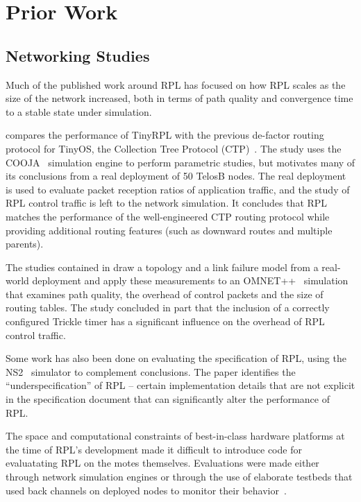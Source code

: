 \section{Prior Work}

\subsection{Networking Studies}
Much of the published work around RPL has focused on how RPL scales as the size
of the network increased, both in terms of path quality and convergence time to
a stable state under simulation. 

\cite{ko2011evaluating} compares the performance of TinyRPL with the previous
de-factor routing protocol for TinyOS, the Collection Tree Protocol
(CTP)~\cite{ctp}. The study uses the COOJA~\cite{cooja} simulation engine to
perform parametric studies, but motivates many of its conclusions from a real
deployment of 50 TelosB nodes. The real deployment is used to evaluate packet
reception ratios of application traffic, and the study of RPL control traffic
is left to the network simulation. It concludes that RPL matches the
performance of the well-engineered CTP routing protocol while providing
additional routing features (such as downward routes and multiple parents).

The studies contained in \cite{tripathi2010performance} draw a topology and a
link failure model from a real-world deployment and apply these measurements to
an OMNET++~\cite{omnet++} simulation that examines path quality, the overhead
of control packets and the size of routing tables. The study concluded in part
that the inclusion of a correctly configured Trickle timer has a significant influence
on the overhead of RPL control traffic.

Some work \cite{clausen2011critical} has also been done on evaluating the
specification of RPL, using the NS2~\cite{ns2} simulator to complement
conclusions. The paper identifies the ``underspecification'' of RPL -- certain
implementation details that are not explicit in the specification document that
can significantly alter the performance of RPL.

The space and computational constraints of best-in-class hardware platforms at
the time of RPL's development made it difficult to introduce code for
evaluatating RPL on the motes themselves. Evaluations were made either through
network simulation engines or through the use of elaborate testbeds that used
back channels on deployed nodes to monitor their
behavior~\cite{fonseca2008tracking}. 

